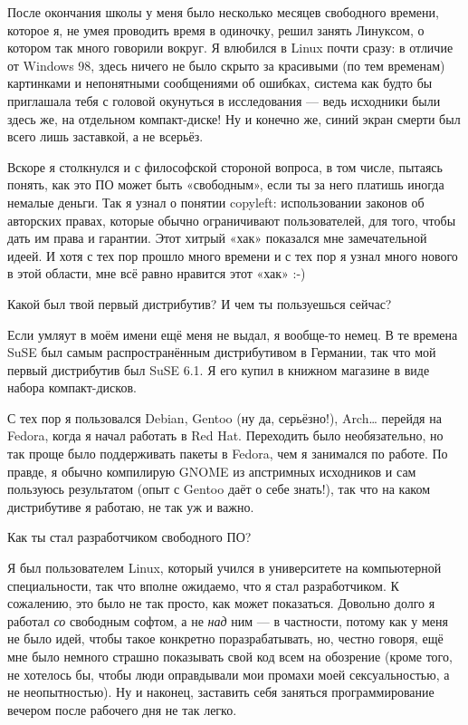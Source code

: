 \documentclass[10pt, a5paper]{article}
\begin{document}
\begin{Parallel}[p]{}{}
{\a После окончания школы у меня было несколько месяцев свободного времени, которое я, не умея проводить время в одиночку, решил занять Линуксом, о котором так много говорили вокруг. Я влюбился в Linux почти сразу: в отличие от Windows 98, здесь ничего не было скрыто за красивыми (по тем временам) картинками и непонятными сообщениями об ошибках, система как будто бы приглашала тебя с головой окунуться в исследования — ведь исходники были здесь же, на отдельном компакт-диске! Ну и конечно же, синий экран смерти был всего лишь заставкой\fakefootnote{}, а не всерьёз.

Вскоре я столкнулся и с философской стороной вопроса, в том числе, пытаясь понять, как это ПО может быть «свободным», если ты за него платишь иногда немалые деньги. Так я узнал о понятии copyleft: использовании законов об авторских правах, которые обычно ограничивают пользователей, для того, чтобы дать им права и гарантии. Этот хитрый «хак» показался мне замечательной идеей. И хотя с тех пор прошло много времени и с тех пор я узнал много нового в этой области, мне всё равно нравится этот «хак» :-)

\q Какой был твой первый дистрибутив? И чем ты пользуешься сейчас?

\a Если умляут в моём имени ещё меня не выдал, я вообще-то немец. В те времена SuSE был самым распространённым дистрибутивом в Германии, так что мой первый дистрибутив был SuSE 6.1\fakefootnote{}. Я его купил в книжном магазине в виде набора компакт-дисков.

С тех пор я пользовался Debian, Gentoo (ну да, серьёзно!), Arch… перейдя на Fedora, когда я начал работать в Red Hat. Переходить было необязательно, но так проще было поддерживать пакеты в Fedora, чем я занимался по работе. По правде, я обычно компилирую GNOME из апстримных исходников и сам пользуюсь результатом (опыт с Gentoo даёт о себе знать!)\fakefootnote{}, так что на каком дистрибутиве я работаю, не так уж и важно.

\q Как ты стал разработчиком свободного ПО?

\a Я был пользователем Linux, который учился в университете на компьютерной специальности, так что вполне ожидаемо, что я стал разработчиком. К сожалению, это было не так просто, как может показаться. Довольно долго я работал \emph{со} свободным софтом, а не \emph{над} ним — в частности, потому как у меня не было идей, чтобы такое конкретно поразрабатывать, но, честно говоря, ещё мне было немного страшно показывать свой код всем на обозрение (кроме того, не хотелось бы, чтобы люди оправдывали мои промахи моей сексуальностью, а не неопытностью). Ну и наконец, заставить себя заняться программирование вечером после рабочего дня не так легко.

}
\end{Parallel}
\end{document}

